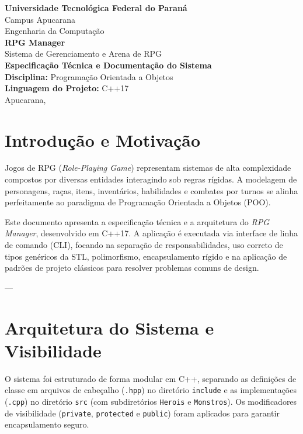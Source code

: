 \documentclass[12pt,a4paper]{article}
\begin{document}
\begin{titlepage}
    \centering
    \Large \textbf{Universidade Tecnológica Federal do Paraná} \\
    \large Campus Apucarana \\
    \large Engenharia da Computação \\
    \vspace{4cm}
    \Huge \textbf{RPG Manager} \\
    \large Sistema de Gerenciamento e Arena de RPG \\
    \vspace{1.5cm}
    \Large \textbf{Especificação Técnica e Documentação do Sistema} \\
    \vspace{4cm}
    \large \textbf{Disciplina:} Programação Orientada a Objetos \\
    \large \textbf{Linguagem do Projeto:} C++17 \\
    \vfill
    \large Apucarana, \the\year
\end{titlepage}

\tableofcontents
\newpage

\section{Introdução e Motivação}
Jogos de RPG (\textit{Role-Playing Game}) representam sistemas de alta complexidade compostos por diversas entidades interagindo sob regras rígidas. A modelagem de personagens, raças, itens, inventários, habilidades e combates por turnos se alinha perfeitamente ao paradigma de Programação Orientada a Objetos (POO). 

Este documento apresenta a especificação técnica e a arquitetura do \textit{RPG Manager}, desenvolvido em C++17. A aplicação é executada via interface de linha de comando (CLI), focando na separação de responsabilidades, uso correto de tipos genéricos da STL, polimorfismo, encapsulamento rígido e na aplicação de padrões de projeto clássicos para resolver problemas comuns de design.

---

\section{Arquitetura do Sistema e Visibilidade}
O sistema foi estruturado de forma modular em C++, separando as definições de classe em arquivos de cabeçalho (\texttt{.hpp}) no diretório \texttt{include} e as implementações (\texttt{.cpp}) no diretório \texttt{src} (com subdiretórios \texttt{Herois} e \texttt{Monstros}). Os modificadores de visibilidade (\texttt{private}, \texttt{protected} e \texttt{public}) foram aplicados para garantir encapsulamento seguro.
\end{document}
